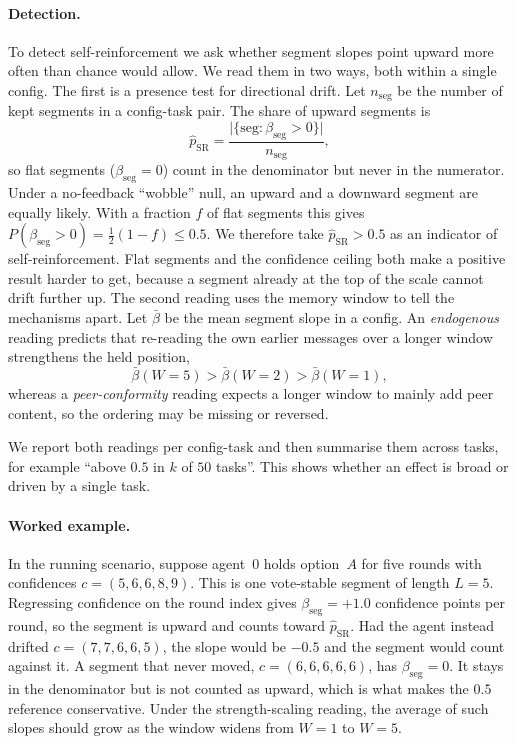 \paragraph{Detection.}
To detect self-reinforcement we ask whether segment slopes point upward more often than chance would allow.
We read them in two ways, both within a single config.
The first is a presence test for directional drift. Let $n_{\mathrm{seg}}$ be the
number of kept segments in a config-task pair. The share of upward segments is
\begin{equation}
  \hat{p}_{\mathrm{SR}}
  = \frac{\bigl|\{\text{seg}: \beta_{\mathrm{seg}} > 0\}\bigr|}{n_{\mathrm{seg}}},
\end{equation}
so flat segments ($\beta_{\mathrm{seg}} = 0$) count in the denominator but never in
the numerator. Under a no-feedback ``wobble'' null, an upward and a downward
segment are equally likely. With a fraction $f$ of flat segments this gives
$P(\beta_{\mathrm{seg}} > 0) = \tfrac{1}{2}(1-f) \leq 0.5$. We therefore take
$\hat{p}_{\mathrm{SR}} > 0.5$ as an indicator of self-reinforcement. Flat segments and
the confidence ceiling both make a positive result harder to get, because a
segment already at the top of the scale cannot drift further up.
The second reading uses the memory window to tell the mechanisms apart.
Let $\bar{\beta}$ be the mean segment slope in a config. An \emph{endogenous}
reading predicts that re-reading the own earlier messages over a longer
window strengthens the held position,
\begin{equation}
  \bar{\beta}(W{=}5) > \bar{\beta}(W{=}2) > \bar{\beta}(W{=}1),
\end{equation}
whereas a \emph{peer-conformity} reading expects a longer window to mainly add
peer content, so the ordering may be missing or reversed.

We report both readings per config-task and then summarise them across tasks, for
example ``above $0.5$ in $k$ of $50$ tasks''. This shows whether an effect is broad
or driven by a single task.

\paragraph{Worked example.}
In the running scenario, suppose agent~$0$ holds option~$A$ for five rounds with
confidences $c = (5, 6, 6, 8, 9)$. This is one vote-stable segment of length
$L = 5$. Regressing confidence on the round index gives
$\beta_{\mathrm{seg}} = +1.0$ confidence points per round, so the segment is
upward and counts toward $\hat{p}_{\mathrm{SR}}$. Had the agent instead drifted
$c = (7, 7, 6, 6, 5)$, the slope would be $-0.5$ and the segment would count
against it. A segment that never moved, $c = (6,6,6,6,6)$, has
$\beta_{\mathrm{seg}} = 0$. It stays in the denominator but is not counted as
upward, which is what makes the $0.5$ reference conservative. Under the
strength-scaling reading, the average of such slopes should grow as the window
widens from $W{=}1$ to $W{=}5$.


